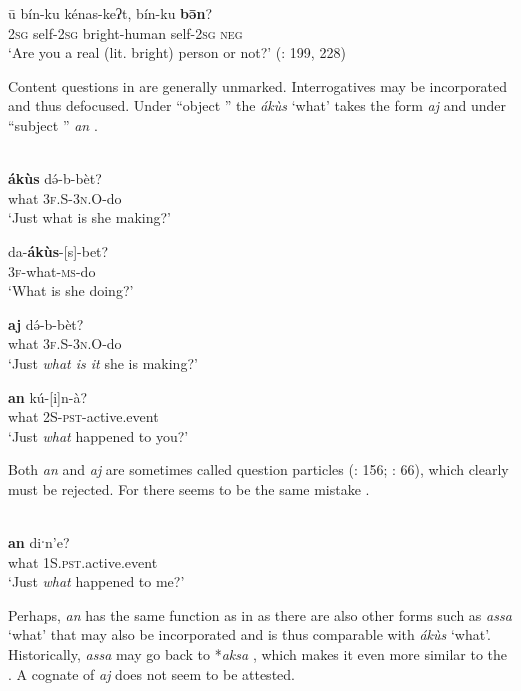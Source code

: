     \ex
    \gll \=u  b{ín}{-k}{u} ké{na}{s-}{keʔ}{t,} bí{n-k}{u} \textbf{ }\textbf{{b}}\textbf{{\=ə}}\textbf{{n}}?\\
    2\textsc{sg}  self-2\textsc{sg}  bright-human  self-2\textsc{sg}  \textsc{neg}\\
    \glt ‘Are you a real (lit. bright) person or not?’ (\citealt{KotorovaNefedov2015}: 199, 228)
    \z
    \z

Content questions in  are generally unmarked. Interrogatives may be incorporated and thus defocused. Under “object ” the  \textit{ákùs} ‘what’ takes the form \textit{aj} and under “subject ” \textit{an} \citep[88]{Vajda2004}.

\ea%
    \label{ex:yeni:7}
    \\
    \ea
    \gll \textbf{{ákùs}} d\'ə{-b-bèt?}\\
    what  3\textsc{f.S}-3\textsc{n}.O-do\\
    \glt ‘Just what is she making?’
    
    \ex
    \gll da-\textbf{{ákùs}}{-[s]-bet?}\\
    3\textsc{f}-what-\textsc{ms}-do\\
    \glt ‘What is she doing?’
    
    \ex
    \gll \textbf{{aj}} d\'ə{-b-bèt?}\\
    what  3\textsc{f.S}-3\textsc{n}.O-do\\
    \glt ‘Just \textit{what is it} she is making?’
    
    \ex
    \gll \textbf{{an}} kú-[i]n-à?\\
    what  2S-\textsc{pst}-active.event\\
    \glt ‘Just \textit{what} happened to you?’ \citep[88]{Vajda2004}\z\z

\noindent Both \textit{an} and \textit{aj} are sometimes called question particles (\citealt{Werner1995}: 156; \citealt{KotorovaNefedov2015}: 66), which clearly must be rejected. For  there seems to be the same mistake \citep[214]{Werner1997b}.

\ea%
    \label{ex:yeni:8}
    \\
    \gll \textbf{{an}} diˑn’e?\\
    what  1S.\textsc{pst.}active.event\\
    \glt ‘Just \textit{what} happened to me?’ \citep[225]{Werner1997b}
    \z

\noindent Perhaps, \textit{an} has the same function as in  as there are also other forms such as \textit{assa} ‘what’ that may also be incorporated and is thus comparable with  \textit{ákùs} ‘what’. Historically,  \textit{assa} may go back to *\textit{aksa} \citep[157]{Werner2004}, which makes it even more similar to the  . A cognate of \textit{aj} does not seem to be attested.

